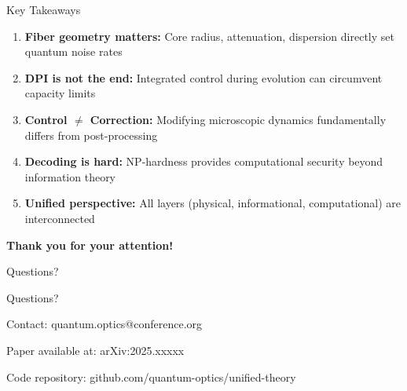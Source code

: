 \documentclass[aspectratio=169,12pt]{beamer}
\begin{document}
\begin{frame}{Key Takeaways}
\begin{enumerate}
\item \textbf{Fiber geometry matters:} Core radius, attenuation, dispersion directly set quantum noise rates

\vspace{0.2cm}

\item \textbf{DPI is not the end:} Integrated control during evolution can circumvent capacity limits

\vspace{0.2cm}

\item \textbf{Control $\neq$ Correction:} Modifying microscopic dynamics fundamentally differs from post-processing

\vspace{0.2cm}

\item \textbf{Decoding is hard:} NP-hardness provides computational security beyond information theory

\vspace{0.2cm}

\item \textbf{Unified perspective:} All layers (physical, informational, computational) are interconnected
\end{enumerate}

\vspace{0.4cm}

\begin{center}
\Large \textbf{Thank you for your attention!}
\end{center}
\end{frame}

\begin{frame}{Questions?}
\begin{center}
\Huge Questions?

\vspace{1cm}

\Large Contact: quantum.optics@conference.org

\vspace{0.5cm}

\normalsize
Paper available at: arXiv:2025.xxxxx

\vspace{0.5cm}

Code repository: github.com/quantum-optics/unified-theory
\end{center}
\end{frame}
\end{document}
